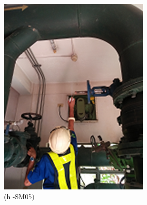 \begin{figure}
\begin{minipage}[b]{0.2\linewidth}
		\includegraphics[width=\textwidth]{figures/fig_ch04_fdas_sm05}
	\caption*{(h -SM05)}
\end{minipage}
	\hspace{0.05cm}
\begin{minipage}[b]{0.2\linewidth}
	\centering

\end{minipage}
\end{figure}
